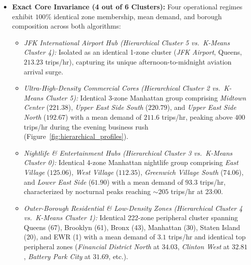 \documentclass[11pt,a4paper]{article}
\begin{document}
\begin{itemize}
    \item \textbf{Exact Core Invariance (4 out of 6 Clusters):} Four operational regimes exhibit $100\%$ identical zone membership, mean demand, and borough composition across both algorithms:
    \begin{itemize}
        \item \textit{JFK International Airport Hub (Hierarchical Cluster 5 vs.\ K-Means Cluster 4):} Isolated as an identical 1-zone cluster (\textit{JFK Airport}, Queens, $213.23$ trips/hr), capturing its unique afternoon-to-midnight aviation arrival surge.
        \item \textit{Ultra-High-Density Commercial Cores (Hierarchical Cluster 2 vs.\ K-Means Cluster 5):} Identical 3-zone Manhattan group comprising \textit{Midtown Center} ($221.38$), \textit{Upper East Side South} ($220.79$), and \textit{Upper East Side North} ($192.67$) with a mean demand of $211.6$ trips/hr, peaking above $400$ trips/hr during the evening business rush (Figure~\ref{fig:hierarchical_profiles}).
        \item \textit{Nightlife \& Entertainment Hubs (Hierarchical Cluster 3 vs.\ K-Means Cluster 0):} Identical 4-zone Manhattan nightlife group comprising \textit{East Village} ($125.06$), \textit{West Village} ($112.35$), \textit{Greenwich Village South} ($74.06$), and \textit{Lower East Side} ($61.90$) with a mean demand of $93.3$ trips/hr, characterized by nocturnal peaks reaching $\sim 205$ trips/hr at 23:00.
        \item \textit{Outer-Borough Residential \& Low-Density Zones (Hierarchical Cluster 4 vs.\ K-Means Cluster 1):} Identical 222-zone peripheral cluster spanning Queens (67), Brooklyn (61), Bronx (43), Manhattan (30), Staten Island (20), and EWR (1) with a mean demand of $3.1$ trips/hr and identical top peripheral zones (\textit{Financial District North} at $34.03$, \textit{Clinton West} at $32.81$, \textit{Battery Park City} at $31.69$, etc.).
    \end{itemize}


\end{itemize}
\end{document}
